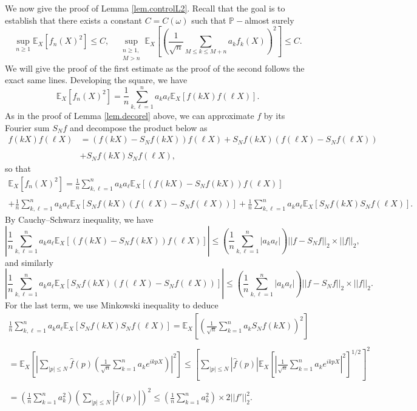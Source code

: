\documentclass{svproc}
\begin{document}
We now give {the proof} of Lemma \ref{lem.controlL2}. Recall that the goal is to establish that there exists a constant $C=C(\omega)$ such that $\mathbb P-$almost surely 
\[
\sup_{n \geq 1} \mathbb E_X [f_n(X)^2] \leq C, \quad \sup_{\substack{n \geq 1,\\ M>n}} \mathbb E_X \left[\left(\frac{1}{\sqrt{n}} \sum_{M\leq k \leq M+n}a_k f_k(X)\right)^2\right] \leq C.
\]
We will give the proof of the first estimate as the proof of the second follows the exact same lines. 
Developing the square, we have 
\[
\mathbb E_X [f_n(X)^2]=  \frac{1}{n} \sum_{k, \ell=1}^n a_k a_{\ell} \mathbb E_X[ f(kX)f(\ell X)]. 
\]
As in the proof of Lemma \ref{lem.decorel} above, we can approximate $f$ by its Fourier sum $S_N f$ and decompose the product below as
\[
\begin{array}{ll}
f(kX)f(\ell X) & = \left(f(kX)-S_N f(kX)\right) f(\ell X) + S_N f(kX) \left(f(\ell X)-S_N f(\ell X)  \right) \\
\\
& +S_N f(kX) S_N f(\ell X),
\end{array}
\]
so that 
\[
\begin{array}{l}
\displaystyle{\mathbb E_X [f_n(X)^2]}  \displaystyle{= \frac{1}{n} \sum_{k, \ell=1}^n a_k a_{\ell} \mathbb E_X \left[ \left( f(kX)-S_N f(kX)\right) f(\ell X)\right] }\\
\\
+\displaystyle{ \frac{1}{n} \sum_{k, \ell=1}^n a_k a_{\ell} \mathbb E_X \left[ S_N f(kX) \left( f(\ell X)-S_N f(\ell X)  \right) \right]}+\displaystyle{ \frac{1}{n} \sum_{k, \ell=1}^n a_k a_{\ell} \mathbb E_X \left[ S_N f(kX) S_N f(\ell X)\right]}.
\end{array}
\]
By Cauchy--Schwarz inequality, we have
\[
\left|  \frac{1}{n} \sum_{k, \ell=1}^n a_k a_{\ell} \mathbb E_X \left[ \left( f(kX)-S_N f(kX)\right) f(\ell X)\right]\right| \leq \left(  \frac{1}{n} \sum_{k, \ell=1}^n |a_k a_{\ell} |\right) ||f-S_N  f||_2 \times ||f||_2, 
\]
and similarly 
\[
\left| \frac{1}{n} \sum_{k, \ell=1}^n a_k a_{\ell} \mathbb E_X \left[ S_N f(kX) \left( f(\ell X)-S_N f(\ell X)  \right) \right]\right| \leq \left(  \frac{1}{n} \sum_{k, \ell=1}^n |a_k a_{\ell} |\right) ||f-S_N  f||_2 \times ||f||_2.
\]
For the last term, we use Minkowski inequality to deduce
\[
\begin{array}{l}
\displaystyle{\frac{1}{n} \sum_{k, \ell=1}^n a_k a_{\ell} \mathbb E_X \left[ S_N f(kX) S_N f(\ell X)\right] } = \displaystyle{\mathbb E_X \left[ \left(\frac{1}{\sqrt{n}} \sum_{k=1}^n a_k S_N f (kX)\right)^2\right]}\\
\\
=  \displaystyle{\mathbb E_X \left[ \left|\sum_{|p|\leq N} \widehat{f}(p) \left( \frac{1}{\sqrt{n}} \sum_{k=1}^n a_k e^{i kp X}\right)\right|^2\right]} \leq \displaystyle{\left[ \sum_{|p|\leq N} |\widehat{f}(p)|  \mathbb E_X \left[ \left|  \frac{1}{\sqrt{n}} \sum_{k=1}^n a_k e^{i kp X}\right|^2\right]^{1/2} \right]^2} \\
\\
 = \displaystyle{\left( \frac{1}{n} \sum_{k=1}^n a_k^2\right) \left( \sum_{|p|\leq N} |\widehat{f}(p)| \right)^2 \leq \left( \frac{1}{n} \sum_{k=1}^n a_k^2\right) \times 2 || f'||_2^2.}
\end{array}
\]
\end{document}
